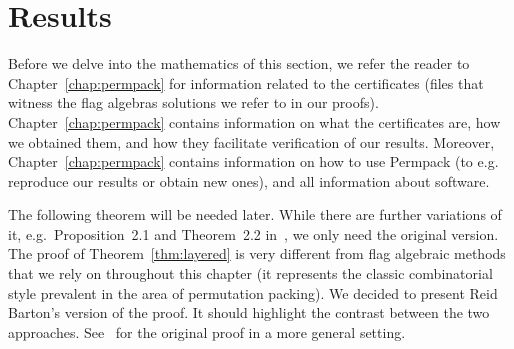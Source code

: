 \documentclass[12pt, a4paper, twoside]{report}
\begin{document}
\section{Results}
\label{sec:mainresults}

Before we delve into the mathematics of this section, we refer the reader to Chapter~\ref{chap:permpack} for information related to the certificates (files that witness the flag algebras solutions we refer to in our proofs). Chapter~\ref{chap:permpack} contains information on what the certificates are, how we obtained them, and how they facilitate verification of our results. Moreover, Chapter~\ref{chap:permpack} contains information on how to use Permpack (to e.g. reproduce our results or obtain new ones), and all information about software.

The following theorem will be needed later. While there are further variations of it, e.g.~Proposition~2.1 and Theorem~2.2 in~\cite{albert2002packing}, we only need the original version. The proof of Theorem~\ref{thm:layered} is very different from flag algebraic methods that we rely on throughout this chapter (it represents the classic combinatorial style prevalent in the area of permutation packing). We decided to present Reid Barton's version of the proof. It should highlight the contrast between the two approaches. See~\cite{barton2004packing} for the original proof in a more general setting.
\end{document}
